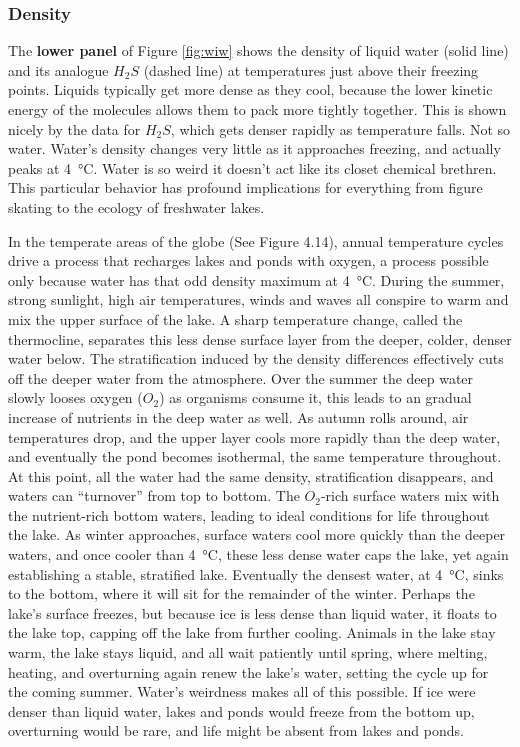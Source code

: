 \documentclass[amstex,12pt]{book}
\begin{document}
\subsubsection{Density}
The \textbf{lower panel} of Figure \ref{fig:wiw} shows the density of liquid water (solid line) and its analogue $H_2S$ (dashed line) at temperatures just above their freezing points. Liquids typically get more dense as they cool, because the lower kinetic energy of the molecules allows them to pack more tightly together. This is shown nicely by the data for $H_2S$, which gets denser rapidly as temperature falls. Not so water. Water's density changes very little as it approaches freezing, and actually peaks at \SI{4}{\degreeCelsius}. Water is so weird it doesn't act like its closet chemical brethren. This particular behavior has profound implications for everything from figure skating to the ecology of freshwater lakes.

In the temperate areas of the globe (See Figure 4.14), annual temperature cycles drive a process that recharges lakes and ponds with oxygen, a process possible only because water has that odd density maximum at \SI{4}{\degreeCelsius}. During the summer, strong sunlight, high air temperatures, winds and waves all conspire to warm and mix the upper surface of the lake. A sharp temperature change, called the thermocline, separates this less dense surface layer from the deeper, colder, denser water below. The stratification induced by the density differences effectively cuts off the deeper water from the atmosphere. Over the summer the deep water slowly looses oxygen ($O_2$) as organisms consume it, this leads to an gradual increase of nutrients in the deep water as well. As autumn rolls around, air temperatures drop, and the upper layer cools more rapidly than the deep water, and eventually the pond becomes isothermal, the same temperature throughout. At this point, all the water had the same density, stratification disappears, and waters can ``turnover'' from top to bottom. The $O_2$-rich surface waters mix with the nutrient-rich bottom waters, leading to ideal conditions for life throughout the lake. As winter approaches, surface waters cool more quickly than the deeper waters, and once cooler than \SI{4}{\degreeCelsius}, these less dense water caps the lake, yet again establishing a stable, stratified lake. Eventually the densest water, at \SI{4}{\degreeCelsius}, sinks to the bottom, where it will sit for the remainder of the winter. Perhaps the lake's surface freezes, but because ice is less dense than liquid water, it floats to the lake top, capping off the lake from further cooling. Animals in the lake stay warm, the lake stays liquid, and all wait patiently until spring, where melting, heating, and overturning again renew the lake's water, setting the cycle up for the coming summer. Water's weirdness makes all of this possible. If ice were denser than liquid water, lakes and ponds would freeze from the bottom up, overturning would be rare, and life might be absent from lakes and ponds.      
\end{document}
